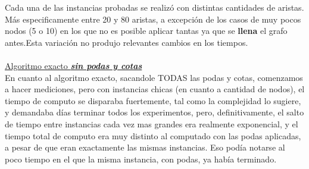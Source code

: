 Cada una de las instancias probadas se realizó con distintas cantidades de aristas. Más especificamente entre 20 y 80 aristas, a excepción de los casos de muy pocos nodos (5 o 10) en los que no es posible aplicar tantas ya que se \textbf{llena} el grafo antes.Esta variación no produjo relevantes cambios en los tiempos.\\ \\

\underline{Algoritmo exacto \textit{\textbf{sin podas y cotas}}}\\
En cuanto al algoritmo exacto, sacandole TODAS las podas y cotas, comenzamos a hacer mediciones, pero con instancias chicas (en cuanto a cantidad de nodos), el tiempo de computo se disparaba fuertemente, tal como la complejidad lo sugiere, y demandaba días terminar todos los experimentos, pero, definitivamente, el salto de tiempo entre instancias cada vez mas grandes era realmente exponencial, y el tiempo total de computo era muy distinto al computado con las podas aplicadas, a pesar de que eran exactamente las mismas instancias. Eso podía notarse al poco tiempo en el que la misma instancia, con podas, ya había terminado.

